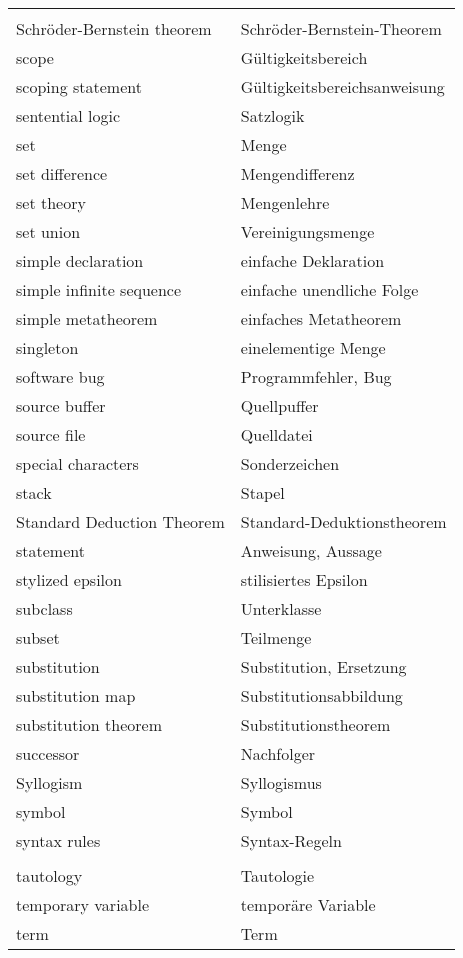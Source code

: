 \begin{longtabu}   { @{} X[l] X[l] }
     & \\
    Schröder-Bernstein theorem & Schröder-Bernstein-{\allowbreak}Theorem \\
    scope & Gültigkeitsbereich \\
    scoping statement & Gültigkeitsbereichsanweisung \\
    sentential logic & Satzlogik \\
    set & Menge \\
    set difference & Mengendifferenz \\
    set theory & Mengenlehre \\
    set union & Vereinigungsmenge \\
    simple declaration & einfache Deklaration \\
    simple infinite sequence & einfache unendliche Folge \\
    simple metatheorem & einfaches Metatheorem \\
    singleton & einelementige Menge \\
    software bug & Programmfehler, Bug \\
    source buffer & Quellpuffer \\
    source file & Quelldatei \\
    special characters & Sonderzeichen \\
    stack & Stapel \\
    Standard Deduction Theorem & Standard-Deduktionstheorem \\
    statement & Anweisung, Aussage \\
    stylized epsilon & stilisiertes Epsilon \\
    subclass & Unterklasse \\
    subset & Teilmenge \\
    substitution & Substitution, Ersetzung \\
    substitution map & Substitutionsabbildung \\
    substitution theorem & Substitutionstheorem \\
    successor & Nachfolger \\
    Syllogism & Syllogismus \\
    symbol & Symbol \\
    syntax rules & Syntax-Regeln \\
     & \\
    tautology & Tautologie \\
    temporary variable & temporäre Variable \\
    term & Term \\

\end{longtabu}
